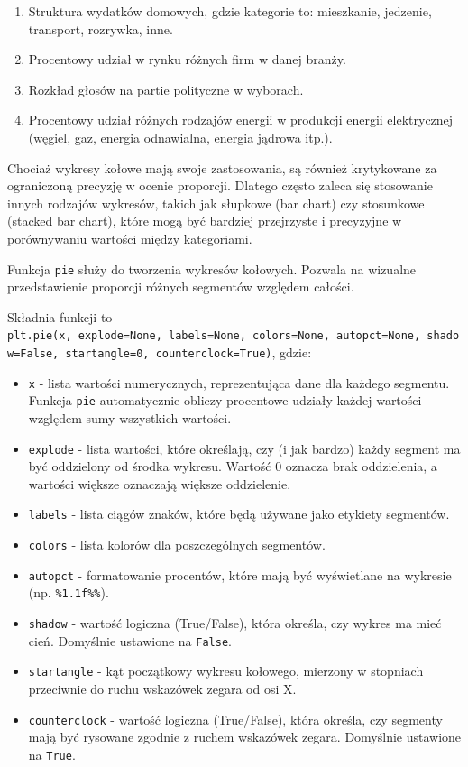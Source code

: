 \documentclass[
  polish,
  letterpaper,
  DIV=11,
  numbers=noendperiod]{scrreprt}
\providecommand{\tightlist}{%
  \setlength{\itemsep}{0pt}\setlength{\parskip}{0pt}}
\begin{document}
\begin{enumerate}
\def\labelenumi{\arabic{enumi}.}
\tightlist
\item
  Struktura wydatków domowych, gdzie kategorie to: mieszkanie, jedzenie,
  transport, rozrywka, inne.
\item
  Procentowy udział w rynku różnych firm w danej branży.
\item
  Rozkład głosów na partie polityczne w wyborach.
\item
  Procentowy udział różnych rodzajów energii w produkcji energii
  elektrycznej (węgiel, gaz, energia odnawialna, energia jądrowa itp.).
\end{enumerate}

Chociaż wykresy kołowe mają swoje zastosowania, są również krytykowane
za ograniczoną precyzję w ocenie proporcji. Dlatego często zaleca się
stosowanie innych rodzajów wykresów, takich jak słupkowe (bar chart) czy
stosunkowe (stacked bar chart), które mogą być bardziej przejrzyste i
precyzyjne w porównywaniu wartości między kategoriami.

Funkcja \texttt{pie} służy do tworzenia wykresów kołowych. Pozwala na
wizualne przedstawienie proporcji różnych segmentów względem całości.

Składnia funkcji to
\texttt{plt.pie(x,\ explode=None,\ labels=None,\ colors=None,\ autopct=None,\ shadow=False,\ startangle=0,\ counterclock=True)},
gdzie:

\begin{itemize}
\tightlist
\item
  \texttt{x} - lista wartości numerycznych, reprezentująca dane dla
  każdego segmentu. Funkcja \texttt{pie} automatycznie obliczy
  procentowe udziały każdej wartości względem sumy wszystkich wartości.
\item
  \texttt{explode} - lista wartości, które określają, czy (i jak bardzo)
  każdy segment ma być oddzielony od środka wykresu. Wartość 0 oznacza
  brak oddzielenia, a wartości większe oznaczają większe oddzielenie.
\item
  \texttt{labels} - lista ciągów znaków, które będą używane jako
  etykiety segmentów.
\item
  \texttt{colors} - lista kolorów dla poszczególnych segmentów.
\item
  \texttt{autopct} - formatowanie procentów, które mają być wyświetlane
  na wykresie (np.
  \texttt{\textquotesingle{}\%1.1f\%\%\textquotesingle{}}).
\item
  \texttt{shadow} - wartość logiczna (True/False), która określa, czy
  wykres ma mieć cień. Domyślnie ustawione na \texttt{False}.
\item
  \texttt{startangle} - kąt początkowy wykresu kołowego, mierzony w
  stopniach przeciwnie do ruchu wskazówek zegara od osi X.
\item
  \texttt{counterclock} - wartość logiczna (True/False), która określa,
  czy segmenty mają być rysowane zgodnie z ruchem wskazówek zegara.
  Domyślnie ustawione na \texttt{True}.
\end{itemize}
\end{document}
